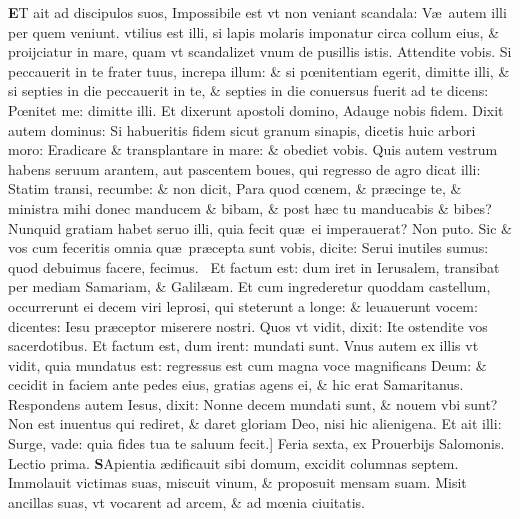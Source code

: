 \documentclass[a5paper,10pt]{book}
\def\leftmarginnote{%
	\lrmarginnote{\hskip -\marginparsep \hskip -6.5em}}
\def\rightmarginnote{%
	\lrmarginnote{\hskip\columnwidth \hskip -1em}}
\def\ae{æ}
\def\oe{œ}
\begin{document}
\begin{multicols*}{2}
\lettrine[lines=2]{\bfseries \color{red} E}{}T\leftmarginnote{\begin{flushright}c. 17.\end{flushright}} ait ad discipulos suos, Impossibile est vt non veniant scandala: V\ae \ autem illi per quem veniunt.
vtilius est illi, si lapis molaris imponatur circa collum eius, \& proijciatur in mare, quam vt scandalizet vnum de pusillis istis.
Attendite vobis. Si peccauerit in te frater tuus, increpa illum: \& si p\oe nitentiam egerit, dimitte illi, \& si septies in die peccauerit in te, \& septies in die conuersus fuerit ad te dicens: P\oe nitet me: dimitte illi. Et dixerunt apostoli domino, Adauge nobis fidem.
Dixit autem dominus: Si habueritis fidem sicut granum sinapis, dicetis huic arbori moro: Eradicare \& transplantare in mare: \& obediet vobis.
Quis autem vestrum habens seruum arantem, aut pascentem boues, qui regresso de agro dicat illi: Statim transi, recumbe: \& non dicit, Para quod c\oe nem, \& pr\ae cinge te, \& ministra mihi donec manducem \& bibam, \& post h\ae c tu manducabis \& bibes?
Nunquid gratiam habet seruo illi, quia fecit qu\ae \ ei imperauerat?
Non puto. Sic \& vos cum feceritis omnia qu\ae \ pr\ae cepta sunt vobis, dicite: Serui inutiles sumus: quod debuimus facere, fecimus. \textdagger \ 
Et\rightmarginnote{B} factum est: dum iret in Ierusalem, transibat per mediam Samariam, \& Galil\ae am.
Et cum ingrederetur quoddam castellum, occurrerunt ei decem viri leprosi, qui steterunt a longe: \& leuauerunt vocem: dicentes: Iesu pr\ae ceptor miserere nostri.
Quos vt vidit, dixit: Ite ostendite vos sacerdotibus. Et factum est, dum irent: mundati sunt. Vnus autem ex illis vt vidit, quia mundatus est: regressus est cum magna voce magnificans Deum: \& cecidit in faciem ante pedes eius, gratias agens ei, \& hic erat Samaritanus.
Respondens autem Iesus, dixit: Nonne decem
mundati sunt, \& nouem vbi sunt?
Non est inuentus qui rediret, \& daret gloriam Deo, nisi hic alienigena. Et ait illi: Surge, vade: quia fides tua te saluum fecit.]
\newline \textswab{C} \color{red} \hypertarget{FRI-SECVNDA-POST-ADV}{Feria sexta,} ex Prouerbijs Salomonis. \hfill Lectio prima. \color{black}
\bookmark[dest=FRI-SECVNDA-POST-ADV]{FERIA SEXTA}
\vspace{-1.25em}
\lettrine[lines=2]{\bfseries S}{}Apientia\rightmarginnote{ca. 9.} \ae dificauit sibi domum, excidit columnas septem.
Immolauit victimas suas, miscuit vinum, \& proposuit mensam suam. Misit ancillas suas, vt vocarent ad arcem, \& ad m\oe nia ciuitatis.

\end{multicols*}
\end{document}
